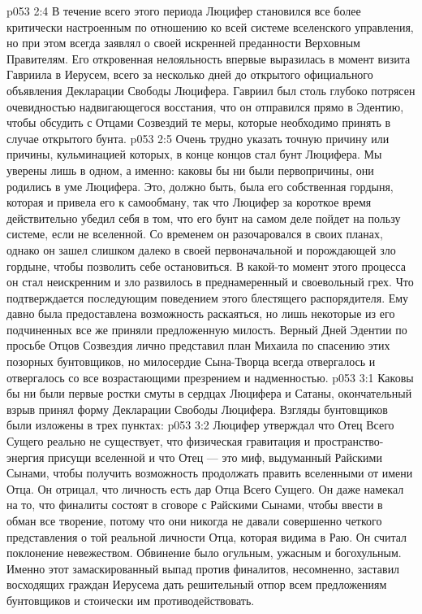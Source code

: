 \vs p053 2:4 В течение всего этого периода Люцифер становился все более критически настроенным по отношению ко всей системе вселенского управления, но при этом всегда заявлял о своей искренней преданности Верховным Правителям. Его откровенная нелояльность впервые выразилась в момент визита Гавриила в Иерусем, всего за несколько дней до открытого официального объявления Декларации Свободы Люцифера. Гавриил был столь глубоко потрясен очевидностью надвигающегося восстания, что он отправился прямо в Эдентию, чтобы обсудить с Отцами Созвездий те меры, которые необходимо принять в случае открытого бунта.
\vs p053 2:5 Очень трудно указать точную причину или причины, кульминацией которых, в конце концов стал бунт Люцифера. Мы уверены лишь в одном, а именно: каковы бы ни были первопричины, они родились в уме Люцифера. Это, должно быть, была его собственная гордыня, которая и привела его к самообману, так что Люцифер за короткое время действительно убедил себя в том, что его бунт на самом деле пойдет на пользу системе, если не вселенной. Со временем он разочаровался в своих планах, однако он зашел слишком далеко в своей первоначальной и порождающей зло гордыне, чтобы позволить себе остановиться. В какой\hyp{}то момент этого процесса он стал неискренним и зло развилось в преднамеренный и своевольный грех. Что подтверждается последующим поведением этого блестящего распорядителя. Ему давно была предоставлена возможность раскаяться, но лишь некоторые из его подчиненных все же приняли предложенную милость. Верный Дней Эдентии по просьбе Отцов Созвездия лично представил план Михаила по спасению этих позорных бунтовщиков, но милосердие Сына\hyp{}Творца всегда отвергалось и отвергалось со все возрастающими презрением и надменностью.
\vs p053 3:1 Каковы бы ни были первые ростки смуты в сердцах Люцифера и Сатаны, окончательный взрыв принял форму Декларации Свободы Люцифера. Взгляды бунтовщиков были изложены в трех пунктах:
\vs p053 3:2 \bibnobreakspace {} Люцифер утверждал что Отец Всего Сущего реально не существует, что физическая гравитация и пространство\hyp{}энергия присущи вселенной и что Отец --- это миф, выдуманный Райскими Сынами, чтобы получить возможность продолжать править вселенными от имени Отца. Он отрицал, что личность есть дар Отца Всего Сущего. Он даже намекал на то, что финалиты состоят в сговоре с Райскими Сынами, чтобы ввести в обман все творение, потому что они никогда не давали совершенно четкого представления о той реальной личности Отца, которая видима в Раю. Он считал поклонение невежеством. Обвинение было огульным, ужасным и богохульным. Именно этот замаскированный выпад против финалитов, несомненно, заставил восходящих граждан Иерусема дать решительный отпор всем предложениям бунтовщиков и стоически им противодействовать.
